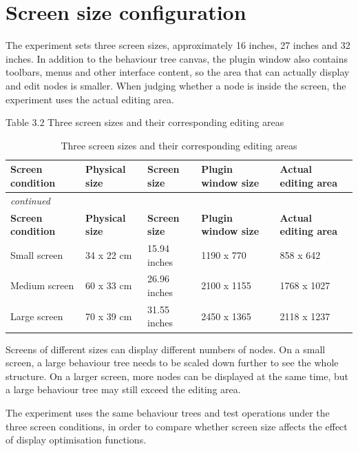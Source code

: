 \documentclass[11pt,a4paper,oneside,extrafontsizes]{memoir}
\begin{document}
\section{Screen size configuration}

The experiment sets three screen sizes, approximately 16 inches, 27 inches and 32 inches. In addition to the behaviour tree canvas, the plugin window also contains toolbars, menus and other interface content, so the area that can actually display and edit nodes is smaller. When judging whether a node is inside the screen, the experiment uses the actual editing area.

Table 3.2 Three screen sizes and their corresponding editing areas

\begin{center}

\begin{longtable}{@{}p{} p{} p{} p{} p{}@{}}
\caption{Three screen sizes and their corresponding editing areas}\label{tab:screen-configs}\\
\toprule
\textbf{Screen condition} & \textbf{Physical size} & \textbf{Screen size} & \textbf{Plugin window size} & \textbf{Actual editing area} \\
\midrule
\endfirsthead
\multicolumn{5}{l}{\itshape continued}\\
\toprule
\textbf{Screen condition} & \textbf{Physical size} & \textbf{Screen size} & \textbf{Plugin window size} & \textbf{Actual editing area} \\
\midrule
\endhead
Small screen & 34 x 22 cm & 15.94 inches & 1190 x 770 & 858 x 642 \\
Medium screen & 60 x 33 cm & 26.96 inches & 2100 x 1155 & 1768 x 1027 \\
Large screen & 70 x 39 cm & 31.55 inches & 2450 x 1365 & 2118 x 1237 \\
\bottomrule
\end{longtable}
\end{center}

Screens of different sizes can display different numbers of nodes. On a small screen, a large behaviour tree needs to be scaled down further to see the whole structure. On a larger screen, more nodes can be displayed at the same time, but a large behaviour tree may still exceed the editing area.

The experiment uses the same behaviour trees and test operations under the three screen conditions, in order to compare whether screen size affects the effect of display optimisation functions.
\end{document}
